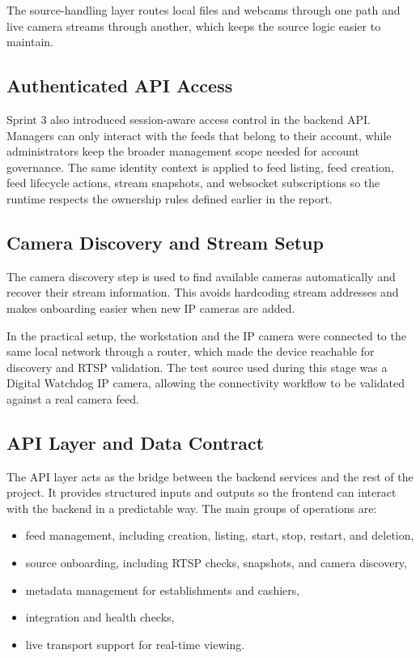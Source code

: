 The source-handling layer routes local files and webcams through one path and live camera streams through another, which keeps the source logic easier to maintain.

\subsection{Authenticated API Access}
Sprint 3 also introduced session-aware access control in the backend API. Managers can only interact with the feeds that belong to their account, while administrators keep the broader management scope needed for account governance. The same identity context is applied to feed listing, feed creation, feed lifecycle actions, stream snapshots, and websocket subscriptions so the runtime respects the ownership rules defined earlier in the report.

\subsection{Camera Discovery and Stream Setup}
The camera discovery step is used to find available cameras automatically and recover their stream information. This avoids hardcoding stream addresses and makes onboarding easier when new IP cameras are added.

In the practical setup, the workstation and the IP camera were connected to the same local network through a router, which made the device reachable for discovery and RTSP validation. The test source used during this stage was a Digital Watchdog IP camera, allowing the connectivity workflow to be validated against a real camera feed.

\subsection{API Layer and Data Contract}
The API layer acts as the bridge between the backend services and the rest of the project. It provides structured inputs and outputs so the frontend can interact with the backend in a predictable way. The main groups of operations are:
\begin{itemize}
    \item feed management, including creation, listing, start, stop, restart, and deletion,
    \item source onboarding, including RTSP checks, snapshots, and camera discovery,
    \item metadata management for establishments and cashiers,
    \item integration and health checks,
    \item live transport support for real-time viewing.
\end{itemize}


